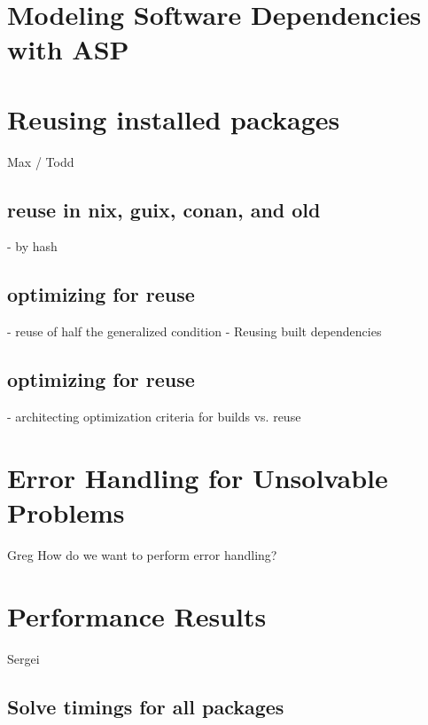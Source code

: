 \section{Modeling Software Dependencies with ASP}





\section{Reusing installed packages}
Max / Todd
\subsection{reuse in nix, guix, conan, and old \spack}
- by hash

\subsection{optimizing for reuse}
- reuse of half the generalized condition
- Reusing built dependencies

\subsection{optimizing for reuse}
- architecting optimization criteria for builds vs. reuse

\section{Error Handling for Unsolvable Problems}
Greg
How do we want to perform error handling?


\section{Performance Results}
Sergei


\subsection{Solve timings for all packages}


